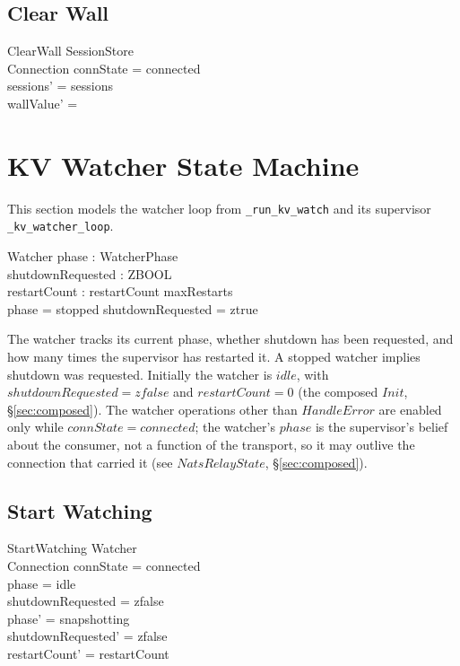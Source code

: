 \documentclass[a4paper,10pt,fleqn]{article}
\begin{document}
\subsection{Clear Wall}

\begin{schema}{ClearWall}
  \Delta SessionStore \\
  \Xi Connection
  \where
  connState = connected \\
  sessions' = sessions \\
  wallValue' = \emptyset
\end{schema}

\section{KV Watcher State Machine}

This section models the watcher loop from \texttt{\_run\_kv\_watch}
and its supervisor \texttt{\_kv\_watcher\_loop}.

\begin{schema}{Watcher}
  phase : WatcherPhase \\
  shutdownRequested : ZBOOL \\
  restartCount : \nat
  \where
  restartCount \leq maxRestarts \\
  phase = stopped \implies shutdownRequested = ztrue
\end{schema}

The watcher tracks its current phase, whether shutdown has been
requested, and how many times the supervisor has restarted it.
A stopped watcher implies shutdown was requested.  Initially the
watcher is $idle$, with $shutdownRequested = zfalse$ and
$restartCount = 0$ (the composed $Init$,
\S\ref{sec:composed}).  The watcher operations other than
$HandleError$ are enabled only while $connState = connected$; the
watcher's $phase$ is the supervisor's belief about the consumer, not a
function of the transport, so it may outlive the connection that
carried it (see $NatsRelayState$, \S\ref{sec:composed}).

\subsection{Start Watching}

\begin{schema}{StartWatching}
  \Delta Watcher \\
  \Xi Connection
  \where
  connState = connected \\
  phase = idle \\
  shutdownRequested = zfalse \\
  phase' = snapshotting \\
  shutdownRequested' = zfalse \\
  restartCount' = restartCount
\end{schema}
\end{document}
